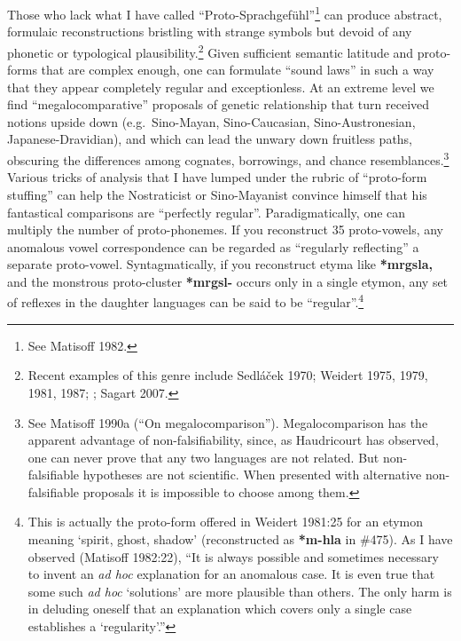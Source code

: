 Those who lack what I have called “Proto-Sprachgefühl”\footnote{See
Matisoff 1982.} can produce abstract, formulaic reconstructions bristling with
strange symbols but devoid of any phonetic or typological
plausibility.\footnote{Recent examples of this genre include Sedláček
1970; Weidert 1975, 1979, 1981, 1987; \citealt{PS-STL}; Sagart 2007.} 
Given sufficient semantic latitude and proto-forms that are complex enough, one
can formulate “sound laws” in such a way that they appear completely regular and
exceptionless. At an extreme level we find “megalocomparative” proposals of
genetic relationship that turn received notions upside down (e.g.\ Sino-Mayan,
Sino-Caucasian, Sino-Austronesian, Japanese-Dravidian), and which can lead the
unwary down fruitless paths, obscuring the differences among cognates,
borrowings, and chance resemblances.\footnote{See Matisoff 1990a (“On
megalocomparison”). Megalocomparison has the apparent advantage of
non-falsifiability, since, as Haudricourt has observed, one can never prove that
any two languages are not related. But non-falsifiable hypotheses are not
scientific. When presented with alternative non-falsifiable proposals it is
impossible to choose among them.} Various tricks of analysis that I have lumped
under the rubric of “proto-form stuffing” can help the Nostraticist or
Sino-Mayanist convince himself that his fantastical comparisons are “perfectly
regular”. Paradigmatically, one can multiply the number of proto-phonemes. If
you reconstruct 35 proto-vowels, any anomalous vowel correspondence can be
regarded as “regularly reflecting” a separate proto-vowel. Syntagmatically, if
you reconstruct etyma like \textbf{*mrgsla,} and the monstrous proto-cluster
\textbf{*mrgsl-}
occurs only in a single etymon, any set of reflexes in the daughter languages
can be said to be “regular”.\footnote{This is actually the proto-form offered
in Weidert 1981:25 for an etymon meaning ‘spirit, ghost, shadow’ (reconstructed
as \textbf{*m-hla} in \textit{} \#475). As I have observed (Matisoff 1982:22), “It is always
possible and sometimes necessary to invent an \textit{ad hoc} explanation for an
anomalous case. It is even true that some such \textit{ad hoc} ‘solutions’ are more
plausible than others. The only harm is in deluding oneself that an explanation
which covers only a single case establishes a ‘regularity’.”}


